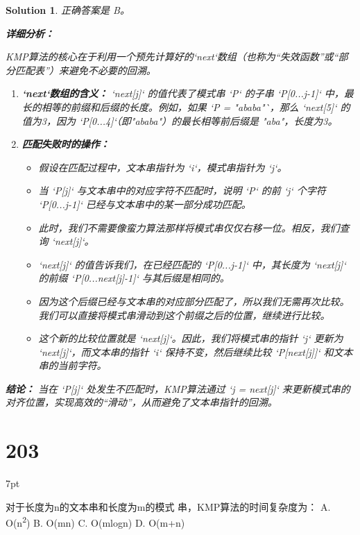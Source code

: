 \documentclass[UTF8]{report}
\newtheorem{solution}{Solution}
\theoremstyle{MyLineTheoremStyle} %
\theoremstyle{MyBlockTheoremStyle} %
\theoremstyle{MySubsubsectionStyle} %
\newenvironment{graybox}{%
        \def\FrameCommand{%
        \hspace{1pt}%
        {\color{gray}\small \vrule width 2pt}%
        {\color{graybox_color}\vrule width 4pt}%
        \colorbox{graybox_color}%
        }%
        \MakeFramed{\advance\hsize-\width\FrameRestore}%
        \noindent\hspace{-4.55pt}%
        \begin{adjustwidth}{}{7pt}%
        \vspace{2pt}\vspace{2pt}%
        }
        {%
        \vspace{2pt}\end{adjustwidth}\endMakeFramed%
        }
\begin{document}
\begin{solution}
正确答案是 B。

\textbf{详细分析：}

KMP算法的核心在于利用一个预先计算好的`next`数组（也称为“失效函数”或“部分匹配表”）来避免不必要的回溯。

\begin{enumerate}
    \item \textbf{`next`数组的含义：}
    `next[j]` 的值代表了模式串 `P` 的子串 `P[0...j-1]` 中，最长的相等的前缀和后缀的长度。例如，如果 `P = "ababa"`，那么 `next[5]` 的值为3，因为 `P[0...4]`（即"ababa"）的最长相等前后缀是 "aba"，长度为3。

    \item \textbf{匹配失败时的操作：}
    \begin{itemize}
        \item 假设在匹配过程中，文本串指针为 `i`，模式串指针为 `j`。
        \item 当 `P[j]` 与文本串中的对应字符不匹配时，说明 `P` 的前 `j` 个字符 `P[0...j-1]` 已经与文本串中的某一部分成功匹配。
        \item 此时，我们不需要像蛮力算法那样将模式串仅仅右移一位。相反，我们查询 `next[j]`。
        \item `next[j]` 的值告诉我们，在已经匹配的 `P[0...j-1]` 中，其长度为 `next[j]` 的前缀 `P[0...next[j]-1]` 与其后缀是相同的。
        \item 因为这个后缀已经与文本串的对应部分匹配了，所以我们无需再次比较。我们可以直接将模式串滑动到这个前缀之后的位置，继续进行比较。
        \item 这个新的比较位置就是 `next[j]`。因此，我们将模式串的指针 `j` 更新为 `next[j]`，而文本串的指针 `i` 保持不变，然后继续比较 `P[next[j]]` 和文本串的当前字符。
    \end{itemize}
\end{enumerate}

\textbf{结论：}
当在 `P[j]` 处发生不匹配时，KMP算法通过 `j = next[j]` 来更新模式串的对齐位置，实现高效的“滑动”，从而避免了文本串指针的回溯。
\end{solution}


\section*{203}
\begin{graybox}
对于长度为n的文本串和长度为m的模式
串，KMP算法的时间复杂度为：
A. O(n\textsuperscript{2})
B. O(mn)
C. O(mlogn)
D. O(m+n)
\end{graybox}
\end{document}
